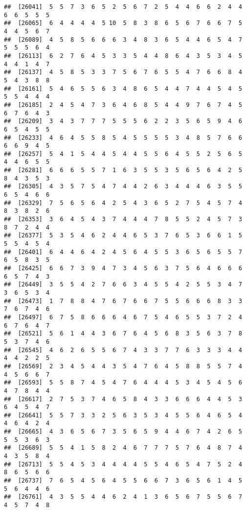 \documentclass[
]{book}
\begin{document}
\begin{verbatim}
##  [26041]  5  5  7  3  6  5  2  5  6  7  2  5  4  4  6  6  2  4  4  6  6  5  5  5
##  [26065]  6  4  4  4  4  5 10  5  8  3  8  6  5  6  7  6  6  7  5  4  4  5  6  7
##  [26089]  4  5  8  5  6  6  6  3  4  8  3  6  5  4  4  6  5  4  7  5  5  5  6  4
##  [26113]  6  2  7  6  4  5  3  3  5  4  4  8  6  4  3  5  3  4  5  4  4  1  4  7
##  [26137]  4  5  8  5  3  3  7  5  6  7  6  5  5  4  7  6  6  8  4  5  4  3  8  8
##  [26161]  5  4  6  5  5  6  3  4  8  6  5  4  4  7  4  4  5  4  5  5  5  4  4  4
##  [26185]  2  4  5  4  7  3  6  4  6  8  5  4  4  9  7  6  7  4  5  6  7  6  4  3
##  [26209]  3  4  3  7  7  7  5  5  5  6  2  2  3  5  6  5  9  4  6  6  5  4  5  5
##  [26233]  4  6  4  5  5  8  5  4  5  5  5  5  3  4  8  5  7  6  6  6  6  9  4  5
##  [26257]  5  4  1  5  4  4  5  4  4  5  5  6  4  5  5  2  5  6  5  4  4  6  5  5
##  [26281]  6  6  6  5  5  7  1  6  3  5  5  3  5  6  5  6  4  2  5  8  4  3  5  3
##  [26305]  4  3  5  7  5  4  7  4  4  2  6  3  4  4  4  6  3  5  5  6  5  4  6  6
##  [26329]  7  5  6  5  6  4  2  5  4  3  6  5  2  7  5  4  5  7  4  8  3  8  2  6
##  [26353]  3  6  4  5  4  3  7  4  4  4  7  8  5  5  2  4  5  7  3  8  7  2  4  4
##  [26377]  5  3  5  4  6  2  4  4  6  5  3  7  6  5  3  6  6  1  5  5  5  4  5  4
##  [26401]  6  4  4  6  4  2  4  5  6  4  5  5  3  6  5  6  5  5  7  6  5  8  3  5
##  [26425]  6  6  7  3  9  4  7  3  4  5  6  3  7  5  6  4  6  6  6  6  5  7  4  3
##  [26449]  3  5  5  4  2  7  6  6  3  4  5  5  4  2  5  5  3  4  7  3  6  5  3  4
##  [26473]  1  7  8  8  4  7  6  7  6  6  7  5  5  6  6  6  8  3  3  7  6  7  4  6
##  [26497]  6  7  5  8  6  6  6  4  6  7  5  4  6  5  5  3  7  2  4  6  7  6  4  7
##  [26521]  5  6  1  4  4  3  6  7  6  4  5  6  8  3  5  6  3  7  8  5  3  7  4  6
##  [26545]  4  6  2  6  5  5  6  7  4  3  3  7  7  6  3  3  3  4  4  4  4  2  2  5
##  [26569]  2  3  4  5  4  4  3  5  4  7  6  4  5  8  8  5  5  7  4  4  5  6  6  7
##  [26593]  5  5  8  7  4  5  4  7  6  4  4  4  5  3  4  5  4  5  6  4  7  8  4  4
##  [26617]  2  7  5  3  7  4  6  5  8  4  3  3  6  6  6  4  4  5  3  6  4  5  4  7
##  [26641]  5  5  7  3  3  2  5  6  3  5  3  4  5  5  6  4  6  5  4  4  6  4  2  4
##  [26665]  4  3  6  5  6  7  3  5  6  5  9  4  4  6  7  4  2  6  5  5  5  3  6  3
##  [26689]  5  5  4  1  5  8  2  4  6  7  7  7  5  7  6  4  8  7  4  4  3  5  8  4
##  [26713]  5  5  4  5  3  4  4  4  4  5  5  4  6  5  4  7  5  2  4  8  6  5  6  6
##  [26737]  7  6  5  4  5  6  4  5  5  6  6  7  3  6  5  6  1  4  5  5  6  4  4  6
##  [26761]  4  3  5  5  4  4  6  2  4  1  3  6  5  6  7  5  5  6  7  4  5  7  4  8

\end{verbatim}
\end{document}
